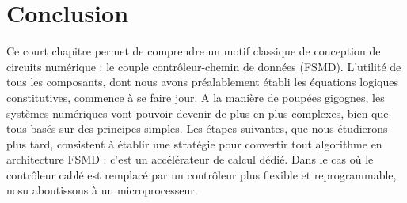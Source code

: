 \section{Conclusion}
Ce court chapitre permet de comprendre un motif classique de conception de circuits numérique : le couple contrôleur-chemin de données (FSMD). L'utilité de
tous les composants, dont nous avons préalablement établi les équations logiques constitutives, commence à se faire jour. A la manière de poupées gigognes,
les systèmes numériques vont pouvoir devenir de plus en plus complexes, bien que tous basés sur des principes simples. Les étapes suivantes, que nous étudierons
plus tard, consistent à établir une stratégie pour convertir tout algorithme en architecture FSMD : c'est un accélérateur de calcul dédié.
Dans le cas où le contrôleur cablé est remplacé par un contrôleur plus flexible et reprogrammable, nosu aboutissons à un microprocesseur.
